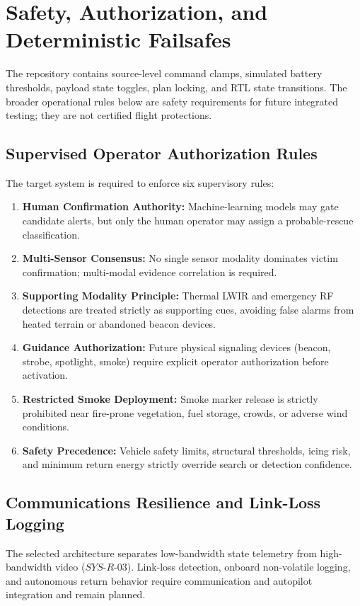 \section{Safety, Authorization, and Deterministic Failsafes}

The repository contains source-level command clamps, simulated battery thresholds, payload state toggles, plan locking, and RTL state transitions. The broader operational rules below are safety requirements for future integrated testing; they are not certified flight protections.

\subsection{Supervised Operator Authorization Rules}
The target system is required to enforce six supervisory rules:
\begin{enumerate}
    \item \textbf{Human Confirmation Authority:} Machine-learning models may gate candidate alerts, but only the human operator may assign a probable-rescue classification.
    \item \textbf{Multi-Sensor Consensus:} No single sensor modality dominates victim confirmation; multi-modal evidence correlation is required.
    \item \textbf{Supporting Modality Principle:} Thermal LWIR and emergency RF detections are treated strictly as supporting cues, avoiding false alarms from heated terrain or abandoned beacon devices.
    \item \textbf{Guidance Authorization:} Future physical signaling devices (beacon, strobe, spotlight, smoke) require explicit operator authorization before activation.
    \item \textbf{Restricted Smoke Deployment:} Smoke marker release is strictly prohibited near fire-prone vegetation, fuel storage, crowds, or adverse wind conditions.
    \item \textbf{Safety Precedence:} Vehicle safety limits, structural thresholds, icing risk, and minimum return energy strictly override search or detection confidence.
\end{enumerate}

\subsection{Communications Resilience and Link-Loss Logging}
The selected architecture separates low-bandwidth state telemetry from high-bandwidth video ($SYS\text{-}R\text{-}03$). Link-loss detection, onboard non-volatile logging, and autonomous return behavior require communication and autopilot integration and remain planned.

